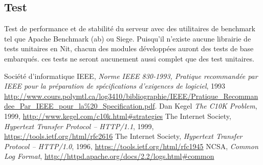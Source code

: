 \documentclass{scrreprt}
\begin{document}
\subsection{Test}
Test de performance et de stabilité du serveur avec des utilitaires de benchmark tel que Apache Benchmark (ab) ou Siege. Puisqu'il n'existe aucune librairie de tests unitaires en Nit, chacun des modules développées auront des tests de base embarqués. ces tests ne seront aucunement aussi complet que des test unitaires.
\begin{thebibliography}{9}
  Société d'informatique IEEE,
\emph{Norme IEEE 830-1993, Pratique recommandée par IEEE pour la préparation de
spécifications d’exigences de logiciel}, 1993
\url{http://www.cours.polymtl.ca/log3410/bibliographie/IEEE/Pratique_Recommandee_Par_IEEE_pour_la\%20_Specification.pdf}.
  Dan Kegel
\emph{The C10K Problem}, 1999, \url{http://www.kegel.com/c10k.html#strategies}
    The Internet Society,
\emph{Hypertext Transfer Protocol -- HTTP/1.1}, 1999,
\url{https://tools.ietf.org/html/rfc2616}
    The Internet Society,
\emph{Hypertext Transfer Protocol -- HTTP/1.0}, 1996,
\url{https://tools.ietf.org/html/rfc1945}
	NCSA,
\emph{Common Log Format},
\url{http://httpd.apache.org/docs/2.2/logs.html#common}	
\end{thebibliography}

\end{document}
